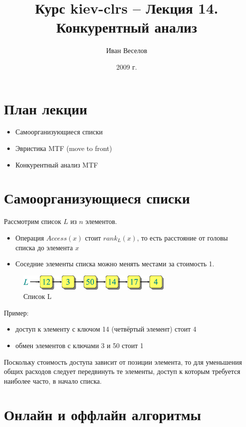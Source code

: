 \documentclass[a4paper,11pt]{article}
\author{Иван Веселов}
\title{Курс kiev-clrs -- Лекция 14. Конкурентный анализ}
\date{2009 г.}
\begin{document}
\maketitle
\tableofcontents
\newpage

\setlength{\parskip}{1ex plus 0.5ex minus 0.2ex}

\section{План лекции}
\begin{itemize}
\item Самоорганизующиеся списки
\item Эвристика MTF (move to front)
\item Конкурентный анализ MTF
\end{itemize}

\section{Самоорганизующиеся списки}

Рассмотрим список $L$ из $n$ элементов.
\begin{itemize}
\item Операция $Access(x)$ стоит $rank_L(x)$, то есть расстояние
  от головы списка до элемента $x$
\item Соседние элементы списка можно менять местами за стоимость 1.
\end{itemize}

\begin{figure}[ht]
  \centering
  \includegraphics[width=3in]{lecture14/list.eps}
  \caption{Список L}
  \label{fig:list}
\end{figure}

Пример:
\begin{itemize}
\item доступ к элементу с ключом 14 (четвёртый элемент) стоит 4
\item обмен элементов с ключами 3 и 50 стоит 1
\end{itemize}

Поскольку стоимость доступа зависит от позиции элемента, то для уменьшения общих
расходов следует передвинуть те элементы, доступ к которым требуется наиболее
часто, в начало списка.

\section{Онлайн и оффлайн алгоритмы}
\end{document}
